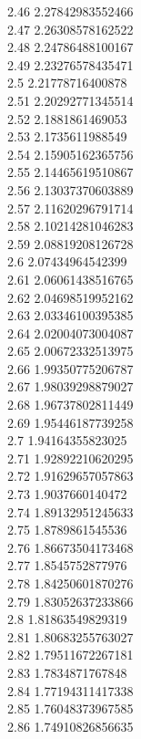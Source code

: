 {2.46	2.27842983552466\\
2.47	2.26308578162522\\
2.48	2.24786488100167\\
2.49	2.23276578435471\\
2.5	2.21778716400878\\
2.51	2.20292771345514\\
2.52	2.1881861469053\\
2.53	2.1735611988549\\
2.54	2.15905162365756\\
2.55	2.14465619510867\\
2.56	2.13037370603889\\
2.57	2.11620296791714\\
2.58	2.10214281046283\\
2.59	2.08819208126728\\
2.6	2.07434964542399\\
2.61	2.06061438516765\\
2.62	2.04698519952162\\
2.63	2.03346100395385\\
2.64	2.02004073004087\\
2.65	2.00672332513975\\
2.66	1.99350775206787\\
2.67	1.98039298879027\\
2.68	1.96737802811449\\
2.69	1.95446187739258\\
2.7	1.94164355823025\\
2.71	1.92892210620295\\
2.72	1.91629657057863\\
2.73	1.9037660140472\\
2.74	1.89132951245633\\
2.75	1.8789861545536\\
2.76	1.86673504173468\\
2.77	1.8545752877976\\
2.78	1.84250601870276\\
2.79	1.83052637233866\\
2.8	1.81863549829319\\
2.81	1.80683255763027\\
2.82	1.79511672267181\\
2.83	1.7834871767848\\
2.84	1.77194311417338\\
2.85	1.76048373967585\\
2.86	1.74910826856635\\
}

